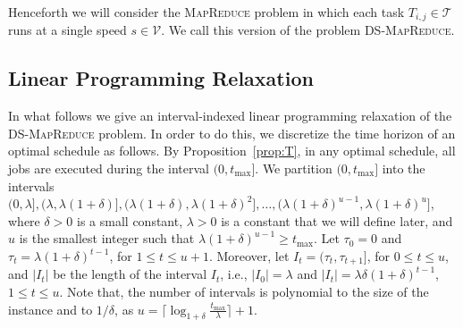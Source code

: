 \documentclass{llncs}
\newcommand{\mr}{\textsc{MapReduce}\xspace}
\newcommand{\dmr}{\textsc{DS-MapReduce}\xspace}
\begin{document}
Henceforth we will consider the \mr problem in which each task $T_{i,j} \in \mathcal{T}$ runs at a single speed $s \in \mathcal{V}$.
We call this version of the problem \dmr.

\subsection{Linear Programming Relaxation}\label{se:lp}

In what follows we give an interval-indexed linear programming relaxation of the \dmr problem.
In order to do this, we discretize the time horizon of an optimal schedule as follows.
By Proposition~\ref{prop:T}, in any optimal schedule, all jobs are executed during the interval $(0,t_{\max}]$.
We partition $(0,t_{\max}]$ into the intervals
$(0,\lambda],(\lambda,\lambda(1+\delta)],(\lambda(1+\delta),\lambda(1+\delta)^2],\ldots,(\lambda(1+\delta)^{u-1},\lambda(1+\delta)^u]$,
where $\delta>0$ is a small constant, $\lambda>0$ is a constant that we will define later,
and $u$ is the smallest integer such that $\lambda(1+\delta)^{u-1} \geq t_{\max}$.
Let $\tau_0=0$ and $\tau_t=\lambda(1+\delta)^{t-1}$, for $1 \leq t \leq u+1$.
Moreover, let $I_t=(\tau_t,\tau_{t+1}]$, for $0 \leq t \leq u$, and
$|I_t|$ be the length of the interval $I_t$, i.e., $|I_0|=\lambda$ and $|I_t|=\lambda\delta(1+\delta)^{t-1}$, $1 \leq t \leq u$.
Note that, the number of intervals is polynomial to the size of the instance and to $1/\delta$, as $u=\lceil\log_{1+\delta}\frac{t_{\max}}{\lambda}\rceil+1$.
\end{document}
